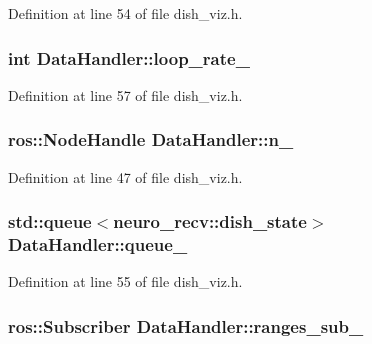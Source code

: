 \-Definition at line 54 of file dish\-\_\-viz.\-h.

\subsubsection[{loop\-\_\-rate\-\_\-}]{\setlength{\rightskip}{0pt plus 5cm}int {\bf \-Data\-Handler\-::loop\-\_\-rate\-\_\-}\hspace{0.3cm}{\ttfamily  [private]}}\label{classDataHandler_a5f78aaaa39bcf9bc18d46a75692801bd}


\-Definition at line 57 of file dish\-\_\-viz.\-h.

\subsubsection[{n\-\_\-}]{\setlength{\rightskip}{0pt plus 5cm}ros\-::\-Node\-Handle {\bf \-Data\-Handler\-::n\-\_\-}\hspace{0.3cm}{\ttfamily  [private]}}\label{classDataHandler_ab1c02192a00c082dd6aee91ccabd9fb9}


\-Definition at line 47 of file dish\-\_\-viz.\-h.

\subsubsection[{queue\-\_\-}]{\setlength{\rightskip}{0pt plus 5cm}std\-::queue$<$neuro\-\_\-recv\-::dish\-\_\-state$>$ {\bf \-Data\-Handler\-::queue\-\_\-}\hspace{0.3cm}{\ttfamily  [private]}}\label{classDataHandler_a454ba02433af88a56992142996e2d24c}


\-Definition at line 55 of file dish\-\_\-viz.\-h.

\subsubsection[{ranges\-\_\-sub\-\_\-}]{\setlength{\rightskip}{0pt plus 5cm}ros\-::\-Subscriber {\bf \-Data\-Handler\-::ranges\-\_\-sub\-\_\-}\hspace{0.3cm}{\ttfamily  [private]}}\label{classDataHandler_af43b29b6fb97c8f98a81e6806e2db798}



